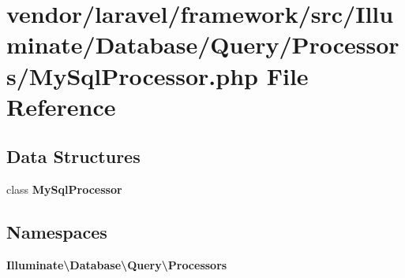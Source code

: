 \section{vendor/laravel/framework/src/\+Illuminate/\+Database/\+Query/\+Processors/\+My\+Sql\+Processor.php File Reference}
\label{_my_sql_processor_8php}
\subsection*{Data Structures}
\begin{DoxyCompactItemize}
\item 
class {\bf My\+Sql\+Processor}
\end{DoxyCompactItemize}
\subsection*{Namespaces}
\begin{DoxyCompactItemize}
\item 
 {\bf Illuminate\textbackslash{}\+Database\textbackslash{}\+Query\textbackslash{}\+Processors}
\end{DoxyCompactItemize}
